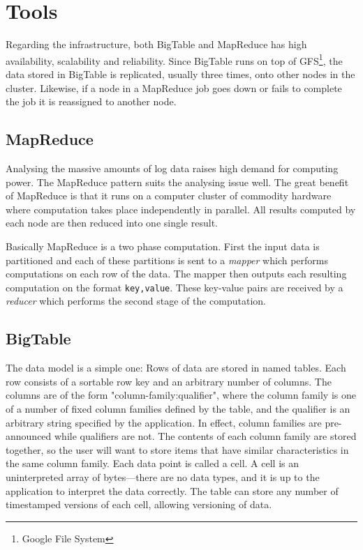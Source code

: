 \documentclass[a4paper,10pt]{book}
\begin{document}
\chapter{Tools}

Regarding the infrastructure, both BigTable and MapReduce has high
availability, scalability and reliability. Since BigTable runs on top of
GFS\footnote{Google File System}, the data stored in BigTable is
replicated, usually three times, onto other nodes in the cluster.
\cite{gfs} Likewise, if a node in a MapReduce job goes down or fails to
complete the job it is reassigned to another node. \cite{mapreduce}


\section{MapReduce}

Analysing the massive amounts of log data raises high demand for computing
power. The MapReduce \cite{mapreduce} pattern suits the analysing issue
well. The great benefit of MapReduce is that it runs on a computer cluster
of commodity hardware where computation takes place independently in
parallel. All results computed by each node are then reduced into one
single result.

Basically MapReduce is a two phase computation. First the input data is
partitioned and each of these partitions is sent to a \textit{mapper} which
performs computations on each row of the data. The mapper then outputs each
resulting computation on the format \texttt{key,value}. These key-value
pairs are received by a \textit{reducer} which performs the second stage of
the computation.


\section{BigTable}

The data model is a simple one: Rows of data are stored in named tables.
Each row consists of a sortable row key and an arbitrary number of columns.
The columns are of the form "column-family:qualifier", where the column
family is one of a number of fixed column families defined by the table,
and the qualifier is an arbitrary string specified by the application. In
effect, column families are pre-announced while qualifiers are not. The
contents of each column family are stored together, so the user will want
to store items that have similar characteristics in the same column family.
Each data point is called a cell. A cell is an uninterpreted array of
bytes---there are no data types, and it is up to the application to
interpret the data correctly. The table can store any number of timestamped
versions of each cell, allowing versioning of data.
\end{document}
